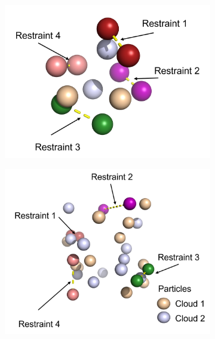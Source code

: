 \begin{figure}[h!]
\begin{subfigure}{0.45\columnwidth}
        \caption{}
        \label{fig: ch_algorithms}
    \end{subfigure}\\
    \begin{subfigure}{0.45\columnwidth}
        \includegraphics[width=\textwidth]{fig/results/algorithm/punktewolke_6_greedy_annotated.png}
        \caption{}
        \label{fig: greedyApproach_6Partikels}
    \end{subfigure}
    \begin{subfigure}{0.45\columnwidth}
        \includegraphics[width=\textwidth]{fig/results/algorithm/punktewolke_15_greedy_annotated.png}
        \caption{}
        \label{fig: greedyApproach_15Partikels}

\end{subfigure}
\end{figure}
